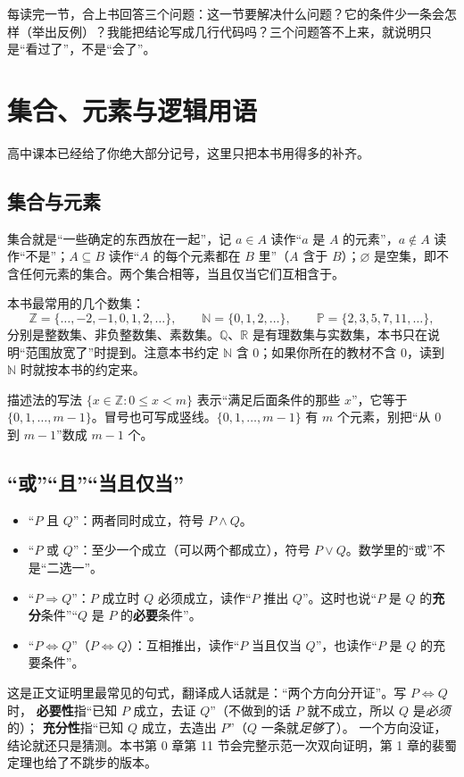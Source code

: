 \documentclass[UTF8,a4paper,11pt,twoside,openright,fontset=fandol]{ctexbook}
\theoremstyle{definition}
\newcommand{\Z}{\mathbb Z}
\newcommand{\N}{\mathbb N}
\newcommand{\Pp}{\mathbb P}
\begin{document}
\begin{tip}[一句话学习方法]
每读完一节，合上书回答三个问题：这一节要解决什么问题？它的条件少一条会怎样（举出反例）？我能把结论写成几行代码吗？三个问题答不上来，就说明只是“看过了”，不是“会了”。
\end{tip}

\section{集合、元素与逻辑用语}
高中课本已经给了你绝大部分记号，这里只把本书用得多的补齐。

\subsection{集合与元素}
集合就是“一些确定的东西放在一起”，记 $a\in A$ 读作“$a$ 是 $A$ 的元素”，$a\notin A$ 读作“不是”；$A\subseteq B$ 读作“$A$ 的每个元素都在 $B$ 里”（$A$ 含于 $B$）；$\varnothing$ 是空集，即不含任何元素的集合。两个集合相等，当且仅当它们互相含于。

本书最常用的几个数集：
\[
\Z=\{\ldots,-2,-1,0,1,2,\ldots\},\qquad \N=\{0,1,2,\ldots\},\qquad \Pp=\{2,3,5,7,11,\ldots\},
\]
分别是整数集、非负整数集、素数集。$\mathbb Q$、$\mathbb R$ 是有理数集与实数集，本书只在说明“范围放宽了”时提到。注意本书约定 $\N$ 含 $0$；如果你所在的教材不含 $0$，读到 $\N$ 时就按本书的约定来。

描述法的写法 $\{x\in\Z:0\le x<m\}$ 表示“满足后面条件的那些 $x$”，它等于 $\{0,1,\ldots,m-1\}$。冒号也可写成竖线。$\{0,1,\ldots,m-1\}$ 有 $m$ 个元素，别把“从 $0$ 到 $m-1$”数成 $m-1$ 个。

\subsection{“或”“且”“当且仅当”}
\begin{itemize}
\item “$P$ 且 $Q$”：两者同时成立，符号 $P\land Q$。
\item “$P$ 或 $Q$”：至少一个成立（可以两个都成立），符号 $P\lor Q$。数学里的“或”不是“二选一”。
\item “$P\Rightarrow Q$”：$P$ 成立时 $Q$ 必须成立，读作“$P$ 推出 $Q$”。这时也说“$P$ 是 $Q$ 的\textbf{充分}条件”“$Q$ 是 $P$ 的\textbf{必要}条件”。
\item “$P\iff Q$”（$P\Leftrightarrow Q$）：互相推出，读作“$P$ 当且仅当 $Q$”，也读作“$P$ 是 $Q$ 的充要条件”。
\end{itemize}

\begin{tip}
这是正文证明里最常见的句式，翻译成人话就是：“两个方向分开证”。写 $P\iff Q$ 时，
\textbf{必要性}指“已知 $P$ 成立，去证 $Q$”（不做到的话 $P$ 就不成立，所以 $Q$ 是\emph{必须}的）；
\textbf{充分性}指“已知 $Q$ 成立，去造出 $P$”（$Q$ 一条就\emph{足够}了）。
一个方向没证，结论就还只是猜测。本书第 0 章第 11 节会完整示范一次双向证明，第 1 章的裴蜀定理也给了不跳步的版本。
\end{tip}
\end{document}
